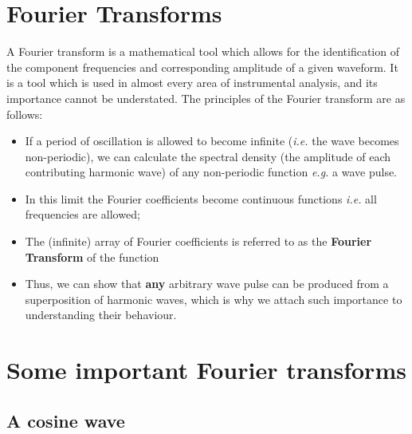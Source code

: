 \documentclass[
]{book}
\providecommand{\tightlist}{%
  \setlength{\itemsep}{0pt}\setlength{\parskip}{0pt}}
\begin{document}
\hypertarget{sec-ch11-fouriertransforms}{%
\section{Fourier Transforms}\label{sec-ch11-fouriertransforms}}

A Fourier transform is a mathematical tool which allows for the identification of the component frequencies and corresponding amplitude of a given waveform. It is a tool which is used in almost every area of instrumental analysis, and its importance cannot be understated. The principles of the Fourier transform are as follows:

\begin{itemize}
\tightlist
\item
  If a period of oscillation is allowed to become infinite (\emph{i.e.} the wave becomes non-periodic), we can calculate the spectral density (the amplitude of each contributing harmonic wave) of any non-periodic function \emph{e.g.} a wave pulse.
\item
  In this limit the Fourier coefficients become continuous functions \emph{i.e.} all frequencies are allowed;
\item
  The (infinite) array of Fourier coefficients is referred to as the \textbf{Fourier Transform} of the function
\item
  Thus, we can show that \textbf{any} arbitrary wave pulse can be produced from a superposition of harmonic waves, which is why we attach such importance to understanding their behaviour.
\end{itemize}

\hypertarget{sec-ch11-importantfouriertransforms}{%
\section{Some important Fourier transforms}\label{sec-ch11-importantfouriertransforms}}

\hypertarget{sec-ch11-ftcosine}{%
\subsection{A cosine wave}\label{sec-ch11-ftcosine}}
\end{document}
